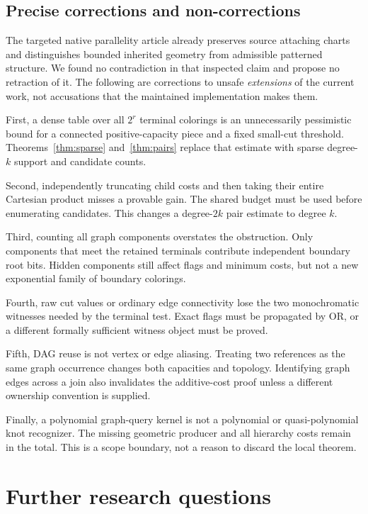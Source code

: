 \documentclass[11pt,a4paper]{article}
\theoremstyle{definition}
\theoremstyle{remark}
\begin{document}
\subsection{Precise corrections and non-corrections}
The targeted native parallelity article already preserves source attaching charts and distinguishes bounded inherited geometry from admissible patterned structure. We found no contradiction in that inspected claim and propose no retraction of it. The following are corrections to unsafe \emph{extensions} of the current work, not accusations that the maintained implementation makes them.

First, a dense table over all $2^r$ terminal colorings is an unnecessarily pessimistic bound for a connected positive-capacity piece and a fixed small-cut threshold. Theorems~\ref{thm:sparse} and~\ref{thm:pairs} replace that estimate with sparse degree-$k$ support and candidate counts.

Second, independently truncating child costs and then taking their entire Cartesian product misses a provable gain. The shared budget must be used before enumerating candidates. This changes a degree-$2k$ pair estimate to degree $k$.

Third, counting all graph components overstates the obstruction. Only components that meet the retained terminals contribute independent boundary root bits. Hidden components still affect flags and minimum costs, but not a new exponential family of boundary colorings.

Fourth, raw cut values or ordinary edge connectivity lose the two monochromatic witnesses needed by the terminal test. Exact flags must be propagated by OR, or a different formally sufficient witness object must be proved.

Fifth, DAG reuse is not vertex or edge aliasing. Treating two references as the same graph occurrence changes both capacities and topology. Identifying graph edges across a join also invalidates the additive-cost proof unless a different ownership convention is supplied.

Finally, a polynomial graph-query kernel is not a polynomial or quasi-polynomial knot recognizer. The missing geometric producer and all hierarchy costs remain in the total. This is a scope boundary, not a reason to discard the local theorem.

\section{Further research questions}
\label{sec:questions}
\end{document}
